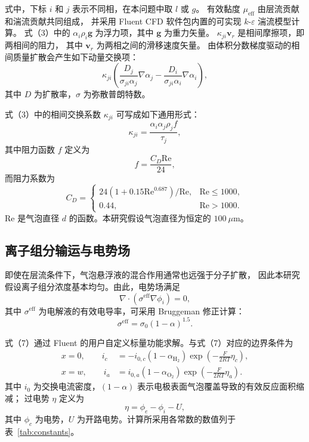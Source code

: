 \documentclass[UTF8,zihao=-4,fontset=fandol]{ctexart}
\newcommand{\vect}[1]{\bm{#1}}
\begin{document}
式中，下标 \(i\) 和 \(j\) 表示不同相，在本问题中取 \(l\) 或 \(g\)。
有效黏度 \(\mu_{\mathrm{eff}}\) 由层流贡献和湍流贡献共同组成，
并采用 Fluent CFD 软件包内置的可实现 \(k\)-\(\varepsilon\) 湍流模型计算。
式（3）中的 \(\alpha_i\rho_i\vect{g}\) 为浮力项，其中 \(\vect{g}\) 为重力矢量。
\(\kappa_{ji}\vect{v}_r\) 是相间摩擦项，即两相间的阻力，
其中 \(\vect{v}_r\) 为两相之间的滑移速度矢量。
由体积分数梯度驱动的相间质量扩散会产生如下动量交换项：
\[
  \kappa_{ji}\left(
  \frac{D_j}{\sigma_{ji}\alpha_j}\nabla\alpha_j
  -\frac{D_i}{\sigma_{ji}\alpha_i}\nabla\alpha_i
  \right),
\]
其中 \(D\) 为扩散率，\(\sigma\) 为弥散普朗特数。

式（3）中的相间交换系数 \(\kappa_{ji}\) 可写成如下通用形式：
\begin{equation}
  \kappa_{ji}=\frac{\alpha_i\alpha_j\rho_j f}{\tau_j},
\end{equation}
其中阻力函数 \(f\) 定义为
\begin{equation}
  f=\frac{C_D\mathrm{Re}}{24},
\end{equation}
而阻力系数为
\begin{equation}
  C_D=
  \begin{cases}
    24\left(1+0.15\mathrm{Re}^{0.687}\right)/\mathrm{Re},
      & \mathrm{Re}\leq 1000,\\
    0.44, & \mathrm{Re}>1000.
  \end{cases}
\end{equation}
\(\mathrm{Re}\) 是气泡直径 \(d\) 的函数。本研究假设气泡直径为恒定的 \(100~\mu\mathrm{m}\)。

\subsection{离子组分输运与电势场}

即使在层流条件下，气泡悬浮液的混合作用通常也远强于分子扩散，
因此本研究假设离子组分浓度基本均匀。由此，电势场满足
\begin{equation}
  \nabla\cdot\left(\sigma^{\mathrm{eff}}\nabla\phi_i\right)=0 ,
\end{equation}
其中 \(\sigma^{\mathrm{eff}}\) 为电解液的有效电导率，可采用 Bruggeman 修正计算：
\begin{equation}
  \sigma^{\mathrm{eff}}=\sigma_0(1-\alpha)^{1.5}.
\end{equation}

式（7）通过 Fluent 的用户自定义标量功能求解。与式（7）对应的边界条件为
\begin{align}
  x=0,\qquad
  i_c&=-i_{0,c}\left(1-\alpha_{\mathrm{H_2}}\right)
  \exp\left(-\frac{F}{2RT}\eta_c\right), \\
  x=w,\qquad
  i_a&=i_{0,a}\left(1-\alpha_{\mathrm{O_2}}\right)
  \exp\left(-\frac{F}{2RT}\eta_a\right).
\end{align}
其中 \(i_0\) 为交换电流密度，\((1-\alpha)\) 表示电极表面气泡覆盖导致的有效反应面积缩减；
过电势 \(\eta\) 定义为
\begin{equation}
  \eta=\phi_e-\phi_i-U ,
\end{equation}
其中 \(\phi_c\) 为电势，\(U\) 为开路电势。计算所采用各常数的数值列于表~\ref{tab:constants}。
\end{document}
